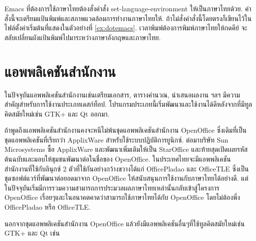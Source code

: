 \begin{thwbr}
Emacs ที่ต้องการใช้ภาษาไทยต้องสั่งคำสั่ง set-language-environment ให้เป็นภาษาไทยด้วย. คำสั่งนี้จะเตรียมแป้นพิมพ์และสภาพแวดล้อมการทำงานภาษาไทยให้. ถ้าไม่สั่งคำสั่งนี้โดยตรงก็เขียนไว้ในไฟล์ตั้งค่าเริ่มต้นที่แสดงในตัวอย่างที่ \ref{ex:dotemacs}. เวลาพิมพ์ต้องการพิมพ์ภาษาไทยให้กดคีย์  จะสลับเปลี่ยนผังแป้นพิมพ์ไปมาระหว่างภาษาอังกฤษและภาษาไทย. 



\section{แอพพลิเคชันสำนักงาน}
ในปัจจุบันแอพพลิเคชันสำนักงานเช่นเตรียมเอกสาร, ตารางคำนวณ, นำเสนอผลงาน ฯลฯ มีความสำคัญสำหรับการใช้งานประเภทเดสก์ท็อป. โปรแกรมประเภทนี้เริ่มพัฒนาและใช้งานได้ดีหลังจากที่มีทูลคิตสมัยใหม่เช่น GTK+ และ Qt ออกมา. 

ถ้าพูดถึงแอพพลิเคชันสำนักงานคงจะหนีไม่พ้นชุดแอพพลิเคชันสำนักงาน OpenOffice ซึ่งเดิมที่เป็นชุดแอพพลิเคชันที่เรียกว่า ApplixWare สำหรับใช้ระบบปฏิบัติการยูนิกซ์. ต่อมาบริษัท Sun Microsystems ซื้อ ApplixWare และพัฒนาเพิ่มเติมให้เป็น StarOffice และท้ายสุดเปิดเผยรหัสต้นฉบับและมอบให้ชุมชนพัฒนาต่อในชื่อของ OpenOffice. ในประเทศไทยจะมีแอพพลิเคชันสำนักงานที่ใช้กับลินุกซ์ 2 ตัวที่ใช้กันอย่างกว้างขวางได้แก่ OfficePladao และ OfficeTLE ซึ่งเป็นชุดซอฟต์แวร์ที่พัฒนาต่อยอดมาจาก OpenOffice ให้สนับสนุนการใช้งานกับภาษาไทยได้อย่างดี. แต่ในปัจจุบันเริ่มมีการรวมความสามารถการประมวลผลภาษาไทยเหล่านั้นกลับเข้าสู่โครงการ OpenOffice เรื่อยๆและในอนาคตคาดว่าสามารถใช้ภาษาไทยได้กับ OpenOffice โดยไม่ต้องพึ่ง OfficePladao หรือ OfficeTLE.

นอกจากชุดแอพพลิเคชันสำนักงาน OpenOffice แล้วยังมีแอพพลิเคชันอื่นๆที่ใช้ทูลคิตสมัยใหม่เช่น GTK+ และ Qt เช่น


\end{thwbr}
